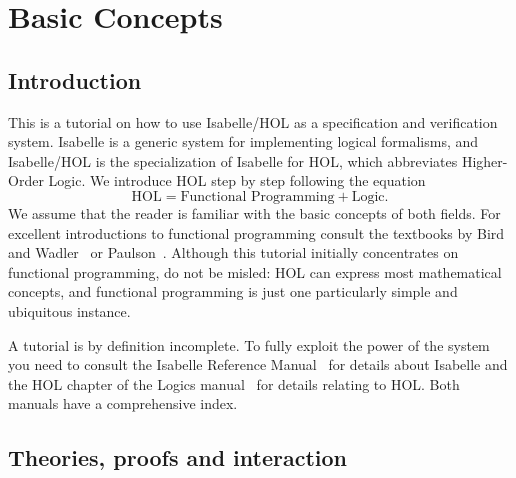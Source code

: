 \chapter{Basic Concepts}

\section{Introduction}

This is a tutorial on how to use Isabelle/HOL as a specification and
verification system. Isabelle is a generic system for implementing logical
formalisms, and Isabelle/HOL is the specialization of Isabelle for
HOL, which abbreviates Higher-Order Logic. We introduce HOL step by step
following the equation
\[ \mbox{HOL} = \mbox{Functional Programming} + \mbox{Logic}. \]
We assume that the reader is familiar with the basic concepts of both fields.
For excellent introductions to functional programming consult the textbooks
by Bird and Wadler~\cite{Bird-Wadler} or Paulson~\cite{Paulson-ML}.  Although
this tutorial initially concentrates on functional programming, do not be
misled: HOL can express most mathematical concepts, and functional
programming is just one particularly simple and ubiquitous instance.

A tutorial is by definition incomplete. To fully exploit the power of the
system you need to consult the Isabelle Reference Manual~\cite{Isa-Ref-Man}
for details about Isabelle and the HOL chapter of the Logics
manual~\cite{Isa-Logics-Man} for details relating to HOL. Both manuals have a
comprehensive index.

\section{Theories, proofs and interaction}
\label{sec:Basic:Theories}

